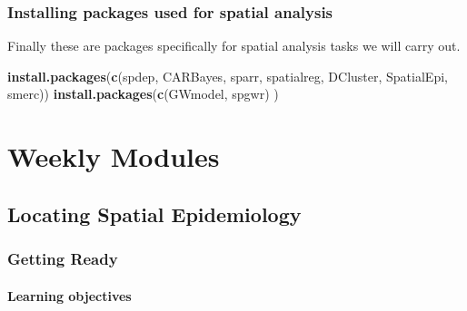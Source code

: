 \documentclass[
]{book}
\newenvironment{Shaded}{\begin{snugshade}}{\end{snugshade}}
\newcommand{\FunctionTok}[1]{\textcolor[rgb]{0.13,0.29,0.53}{\textbf{#1}}}
\newcommand{\NormalTok}[1]{#1}
\newcommand{\StringTok}[1]{\textcolor[rgb]{0.31,0.60,0.02}{#1}}
\begin{document}
\hypertarget{installing-packages-used-for-spatial-analysis}{%
\section*{Installing packages used for spatial analysis}\label{installing-packages-used-for-spatial-analysis}}

Finally these are packages specifically for spatial analysis tasks we will carry out.

\begin{Shaded}
\begin{Highlighting}[]
\FunctionTok{install.packages}\NormalTok{(}\FunctionTok{c}\NormalTok{(}\StringTok{\textquotesingle{}spdep\textquotesingle{}}\NormalTok{, }\StringTok{\textquotesingle{}CARBayes\textquotesingle{}}\NormalTok{, }\StringTok{\textquotesingle{}sparr\textquotesingle{}}\NormalTok{, }\StringTok{\textquotesingle{}spatialreg\textquotesingle{}}\NormalTok{,  }\StringTok{\textquotesingle{}DCluster\textquotesingle{}}\NormalTok{, }\StringTok{\textquotesingle{}SpatialEpi\textquotesingle{}}\NormalTok{, }\StringTok{\textquotesingle{}smerc\textquotesingle{}}\NormalTok{))}
\FunctionTok{install.packages}\NormalTok{(}\FunctionTok{c}\NormalTok{(}\StringTok{\textquotesingle{}GWmodel\textquotesingle{}}\NormalTok{, }\StringTok{\textquotesingle{}spgwr\textquotesingle{}}\NormalTok{) )}
\end{Highlighting}
\end{Shaded}

\hypertarget{part-weekly-modules}{%
\part{Weekly Modules}\label{part-weekly-modules}}

\hypertarget{locating-spatial-epidemiology}{%
\chapter{Locating Spatial Epidemiology}\label{locating-spatial-epidemiology}}

\hypertarget{getting-ready}{%
\section{Getting Ready}\label{getting-ready}}

\hypertarget{learning-objectives}{%
\subsection{Learning objectives}\label{learning-objectives}}
\end{document}
